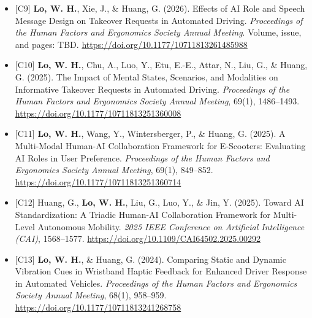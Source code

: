 \documentclass[11pt]{article}
\begin{document}
\begin{itemize}[leftmargin=*, topsep=0pt, itemsep=6pt]
  \item \begin{samepage}{[C9]} \textbf{Lo, W. H.}, Xie, J., \& Huang, G. (2026). Effects of AI Role and Speech Message Design on Takeover Requests in Automated Driving. \textit{Proceedings of the Human Factors and Ergonomics Society Annual Meeting}. Volume, issue, and pages: TBD. \href{https://doi.org/10.1177/10711813261485988}{\url{https://doi.org/10.1177/10711813261485988}}
  \par\end{samepage}

  \item \begin{samepage}{[C10]} \textbf{Lo, W. H.}, Chu, A., Luo, Y., Etu, E.-E., Attar, N., Liu, G., \& Huang, G. (2025). The Impact of Mental States, Scenarios, and Modalities on Informative Takeover Requests in Automated Driving. \textit{Proceedings of the Human Factors and Ergonomics Society Annual Meeting}, 69(1), 1486--1493. \href{https://doi.org/10.1177/10711813251360008}{\url{https://doi.org/10.1177/10711813251360008}}
  \par\end{samepage}

  \item \begin{samepage}{[C11]} \textbf{Lo, W. H.}, Wang, Y., Wintersberger, P., \& Huang, G. (2025). A Multi-Modal Human-AI Collaboration Framework for E-Scooters: Evaluating AI Roles in User Preference. \textit{Proceedings of the Human Factors and Ergonomics Society Annual Meeting}, 69(1), 849--852. \href{https://doi.org/10.1177/10711813251360714}{\url{https://doi.org/10.1177/10711813251360714}}
  \par\end{samepage}

  \item \begin{samepage}{[C12]} Huang, G., \textbf{Lo, W. H.}, Liu, G., Luo, Y., \& Jin, Y. (2025). Toward AI Standardization: A Triadic Human-AI Collaboration Framework for Multi-Level Autonomous Mobility. \textit{2025 IEEE Conference on Artificial Intelligence (CAI)}, 1568--1577. \href{https://doi.org/10.1109/CAI64502.2025.00292}{\url{https://doi.org/10.1109/CAI64502.2025.00292}}
  \par\end{samepage}

  \item \begin{samepage}{[C13]} \textbf{Lo, W. H.}, \& Huang, G. (2024). Comparing Static and Dynamic Vibration Cues in Wristband Haptic Feedback for Enhanced Driver Response in Automated Vehicles. \textit{Proceedings of the Human Factors and Ergonomics Society Annual Meeting}, 68(1), 958--959. \href{https://doi.org/10.1177/10711813241268758}{\url{https://doi.org/10.1177/10711813241268758}}
  \par\end{samepage}


\end{itemize}
\end{document}
